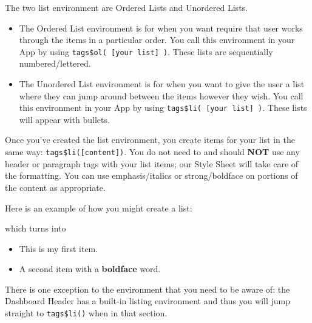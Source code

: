 \documentclass[
]{book}
\newenvironment{Shaded}{\begin{snugshade}}{\end{snugshade}}
\newcommand{\KeywordTok}[1]{\textcolor[rgb]{0.13,0.29,0.53}{\textbf{#1}}}
\newcommand{\NormalTok}[1]{#1}
\newcommand{\OperatorTok}[1]{\textcolor[rgb]{0.81,0.36,0.00}{\textbf{#1}}}
\newcommand{\StringTok}[1]{\textcolor[rgb]{0.31,0.60,0.02}{#1}}
\providecommand{\tightlist}{%
  \setlength{\itemsep}{0pt}\setlength{\parskip}{0pt}}
\begin{document}
The two list environment are Ordered Lists and Unordered Lists.

\begin{itemize}
\tightlist
\item
  The Ordered List environment is for when you want require that user works through the items in a particular order. You call this environment in your App by using \texttt{tags\$ol(\ {[}your\ list{]}\ )}. These lists are sequentially numbered/lettered.
\item
  The Unordered List environment is for when you want to give the user a list where they can jump around between the items however they wish. You call this environment in your App by using \texttt{tags\$li(\ {[}your\ list{]}\ )}. These lists will appear with bullets.
\end{itemize}

Once you've created the list environment, you create items for your list in the same way: \texttt{tags\$li({[}content{]})}. You do not need to and should \textbf{NOT} use any header or paragraph tags with your list items; our Style Sheet will take care of the formatting. You can use emphasis/italics or strong/boldface on portions of the content as appropriate.

Here is an example of how you might create a list:

\begin{Shaded}
\end{Shaded}

which turns into

\begin{itemize}
\tightlist
\item
  This is my first item.
\item
  A second item with a \textbf{boldface} word.
\end{itemize}

There is one exception to the environment that you need to be aware of: the Dashboard Header has a built-in listing environment and thus you will jump straight to \texttt{tags\$li()} when in that section.
\end{document}
